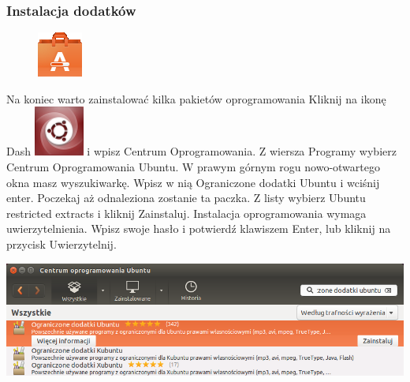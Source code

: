 \subsubsection{Instalacja dodatków}
\begin{figure}
        \includegraphics[width=\linewidth]{images/pierwsze_uruchomienie_dodatki1.png}
\end{figure}

Na koniec warto zainstalować kilka pakietów oprogramowania Kliknij na ikonę Dash \includegraphics[scale=0.35]{images/ikony_dash.png} i wpisz \textcolor{ubuntu_orange}{Centrum Oprogramowania}. Z wiersza \textcolor{ubuntu_orange}{Programy} wybierz \textcolor{ubuntu_orange}{Centrum Oprogramowania Ubuntu}. W prawym górnym rogu nowo-otwartego okna masz wyszukiwarkę. Wpisz w nią \textcolor{ubuntu_orange}{Ograniczone dodatki Ubuntu} i wciśnij enter. Poczekaj aż odnaleziona zostanie ta paczka. Z listy wybierz \textcolor{ubuntu_orange}{Ubuntu restricted extracts} i kliknij \textcolor{ubuntu_orange}{Zainstaluj}. Instalacja oprogramowania wymaga uwierzytelnienia. Wpisz swoje hasło i potwierdź klawiszem Enter, lub kliknij na przycisk \textcolor{ubuntu_orange}{Uwierzytelnij}.
\begin{center}
        \includegraphics[width=\linewidth]{images/pierwsze_uruchomienie_dodatki2.png}
\end{center}

